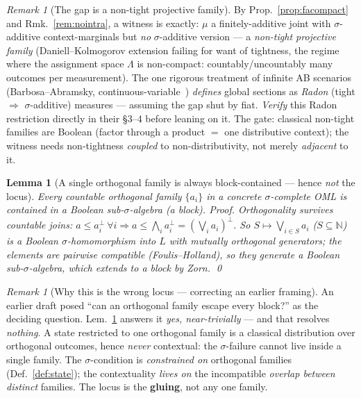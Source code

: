 \documentclass[11pt]{article}
\newtheorem{lemma}[theorem]{Lemma}
\theoremstyle{definition}
\theoremstyle{remark}
\newtheorem{remark}[theorem]{Remark}
\begin{document}
\begin{remark}[The gap is a non-tight projective family]\label{rem:nontight}
By Prop.~\ref{prop:facompact} and Rmk.~\ref{rem:nointra}, a witness is exactly:
$\mu$ a finitely-additive joint with $\sigma$-additive context-marginals but
\emph{no} $\sigma$-additive version --- a \emph{non-tight projective family}
(Daniell--Kolmogorov extension failing for want of tightness, the regime where the
assignment space $\Lambda$ is non-compact: countably/uncountably many outcomes per
measurement). The one rigorous treatment of infinite AB scenarios
(Barbosa--Abramsky, continuous-variable~\cite{BarbosaAbramsky2022}) \emph{defines}
global sections as \emph{Radon} (tight $\Rightarrow$ $\sigma$-additive) measures ---
assuming the gap shut by fiat. \emph{Verify} this Radon restriction directly in
their \S3--4 before leaning on it. The gate: classical non-tight families are
Boolean (factor through a product $=$ one distributive context); the witness needs
non-tightness \emph{coupled} to non-distributivity, not merely \emph{adjacent} to it.
\end{remark}

\begin{lemma}[A single orthogonal family is always block-contained --- hence \emph{not} the locus]\label{lem:famblock}
Every countable orthogonal family $\{a_i\}$ in a concrete $\sigma$-complete OML is
contained in a Boolean sub-$\sigma$-algebra (a block). \emph{Proof.} Orthogonality
survives countable joins: $a\le a_i^{\perp}\ \forall i\Rightarrow a\le\bigwedge_i
a_i^{\perp}=(\bigvee_i a_i)^{\perp}$. So $S\mapsto\bigvee_{i\in S}a_i$
($S\subseteq\mathbb N$) is a Boolean $\sigma$-homomorphism into $L$ with mutually
orthogonal generators; the elements are pairwise compatible (Foulis--Holland), so
they generate a Boolean sub-$\sigma$-algebra, which extends to a block by Zorn. \qed
\end{lemma}

\begin{remark}[Why this is the wrong locus --- correcting an earlier framing]\label{rem:wronglocus}
An earlier draft posed ``can an orthogonal family escape every block?'' as the
deciding question. Lem.~\ref{lem:famblock} answers it \emph{yes, near-trivially} ---
and that resolves \emph{nothing}. A state restricted to one orthogonal family is a
classical distribution over orthogonal outcomes, hence \emph{never} contextual: the
$\sigma$-failure cannot live inside a single family. The $\sigma$-condition is
\emph{constrained on} orthogonal families (Def.~\ref{def:state}); the contextuality
\emph{lives on} the incompatible \emph{overlap between distinct} families. The locus
is the \textbf{gluing}, not any one family.
\end{remark}
\end{document}
